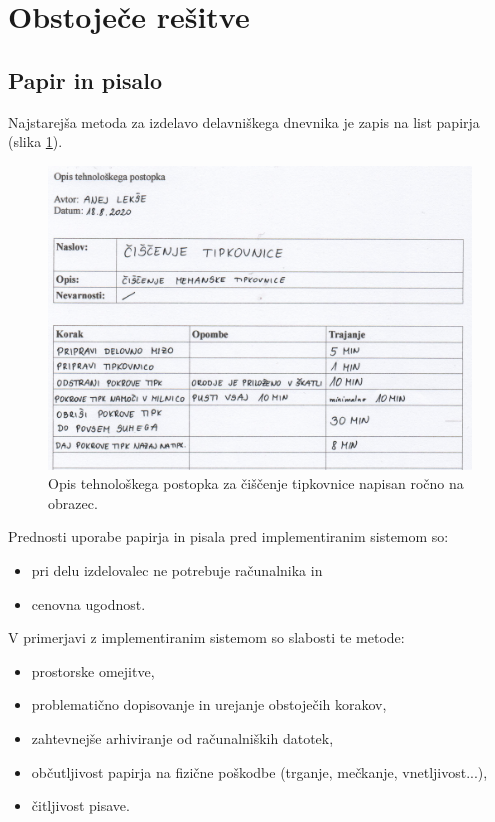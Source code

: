 \documentclass[a4paper, 12pt]{book}
\begin{document}
\section{Obstoječe rešitve}



\subsection{Papir in pisalo}

Najstarejša metoda za izdelavo delavniškega dnevnika je zapis na list papirja (slika \ref{paper}).

\begin{figure}[H]
\begin{center}
\includegraphics[width=13.5cm]{report_paper_small}
\end{center}
\caption{Opis tehnološkega postopka za čiščenje tipkovnice napisan ročno na obrazec.}
\label{paper}
\end{figure}


\noindent Prednosti uporabe papirja in pisala pred implementiranim sistemom so:
\begin{itemize}
	\item pri delu izdelovalec ne potrebuje računalnika in
	\item cenovna ugodnost.
\end{itemize}
V primerjavi z implementiranim sistemom so slabosti te metode:
\begin{itemize}
	\item prostorske omejitve,
	\item problematično dopisovanje in urejanje obstoječih korakov,
	\item zahtevnejše arhiviranje od računalniških datotek,
	\item občutljivost papirja na fizične poškodbe (trganje, mečkanje, vnetljivost...),
	\item čitljivost pisave.
\end{itemize}
\end{document}
